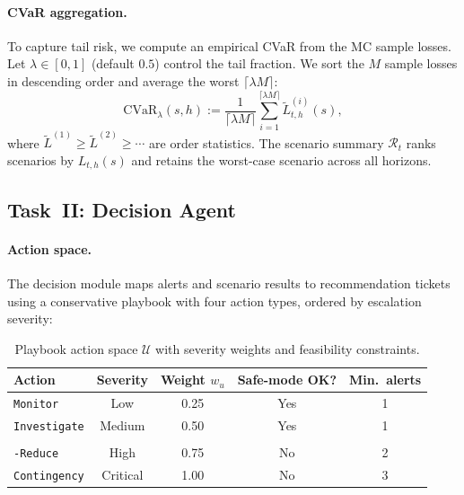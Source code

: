 \paragraph{CVaR aggregation.}
To capture tail risk, we compute an empirical CVaR from the MC sample losses. Let $\lambda\in[0,1]$ (default $0.5$) control the tail fraction. We sort the $M$ sample losses in descending order and average the worst $\lceil \lambda M \rceil$:
\begin{equation}
\label{eq:cvar}
\mathrm{CVaR}_\lambda(s,h) := \frac{1}{\lceil \lambda M \rceil} \sum_{i=1}^{\lceil \lambda M \rceil} \widetilde{L}^{(i)}_{t,h}(s),
\end{equation}
where $\widetilde{L}^{(1)} \ge \widetilde{L}^{(2)} \ge \cdots$ are order statistics. The scenario summary $\mathcal{R}_t$ ranks scenarios by $L_{t,h}(s)$ and retains the worst-case scenario across all horizons.

\subsection{Task~II: Decision Agent}
\label{subsec:decision_v1}

\paragraph{Action space.}
The decision module maps alerts and scenario results to recommendation tickets using a conservative playbook with four action types, ordered by escalation severity:

\begin{table}[!t]
\centering
\footnotesize
\setlength{\tabcolsep}{4pt}
\begin{tabular}{lcccc}
\toprule
Action & Severity & Weight $w_u$ & Safe-mode OK? & Min.\ alerts \\
\midrule
\texttt{Monitor} & Low & 0.25 & Yes & 1 \\
\texttt{Investigate} & Medium & 0.50 & Yes & 1 \\
\makecell[l]{\texttt{Recommend}\\[-1pt]\texttt{-Reduce}} & High & 0.75 & No & 2 \\
\texttt{Contingency} & Critical & 1.00 & No & 3 \\
\bottomrule
\end{tabular}
\caption{Playbook action space $\mathcal{U}$ with severity weights and feasibility constraints.}
\label{tab:playbook}
\end{table}

